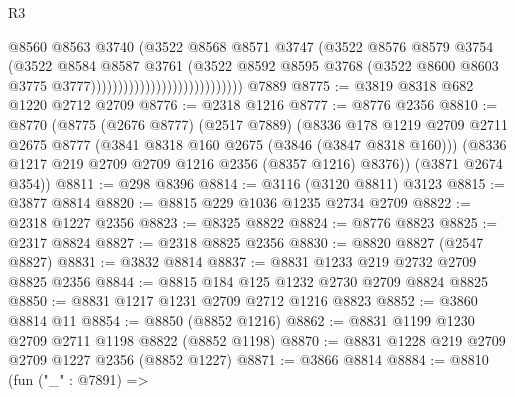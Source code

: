 \begin{lexlean}{R3}
\begin{coremodule}
                                                  @8560
                                                  @8563
                                                  @3740
                                                  (@3522
                                                    @8568
                                                    @8571
                                                    @3747
                                                    (@3522
                                                      @8576
                                                      @8579
                                                      @3754
                                                      (@3522
                                                        @8584
                                                        @8587
                                                        @3761
                                                        (@3522
                                                          @8592
                                                          @8595
                                                          @3768
                                                          (@3522
                                                            @8600
                                                            @8603
                                                            @3775
                                                            @3777))))))))))))))))))))))))))))
    @7889
@8775 := @3819 @8318 @682 @1220 @2712 @2709
@8776 := @2318 @1216
@8777 := @8776 @2356
@8810 := @8770
    (@8775
      (@2676 @8777)
      (@2517 @7889)
      (@8336
        @178
        @1219
        @2709
        @2711
        @2675
        @8777
        (@3841 @8318 @160 @2675 (@3846 (@3847 @8318 @160)))
        (@8336 @1217 @219 @2709 @2709 @1216 @2356 (@8357 @1216) @8376))
      (@3871 @2674 @354))
@8811 := @298 @8396
@8814 := @3116 (@3120 @8811) @3123
@8815 := @3877 @8814
@8820 := @8815 @229 @1036 @1235 @2734 @2709
@8822 := @2318 @1227 @2356
@8823 := @8325 @8822
@8824 := @8776 @8823
@8825 := @2317 @8824
@8827 := @2318 @8825 @2356
@8830 := @8820 @8827 (@2547 @8827)
@8831 := @3832 @8814
@8837 := @8831 @1233 @219 @2732 @2709 @8825 @2356
@8844 := @8815 @184 @125 @1232 @2730 @2709 @8824 @8825
@8850 := @8831 @1217 @1231 @2709 @2712 @1216 @8823
@8852 := @3860 @8814 @11
@8854 := @8850 (@8852 @1216)
@8862 := @8831 @1199 @1230 @2709 @2711 @1198 @8822 (@8852 @1198)
@8870 := @8831 @1228 @219 @2709 @2709 @1227 @2356 (@8852 @1227)
@8871 := @3866 @8814
@8884 := @8810
    (fun ("_" : @7891) =>

\end{coremodule}
\end{lexlean}
